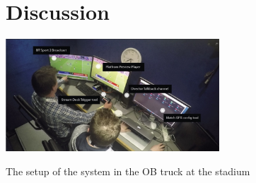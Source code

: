 \documentclass[sigchi-a, authorversion]{acmart}
\begin{document}

\section{Discussion}

\begin{marginfigure}
    \vspace{-18pc}
    \hspace*{-1cm}
    \includegraphics[width=8cm]{Figures/liveproduction.jpg}
    \caption{The setup of the system in the OB truck at the stadium}
    \label{fig:liveproduction}
\end{marginfigure}
\end{document}
